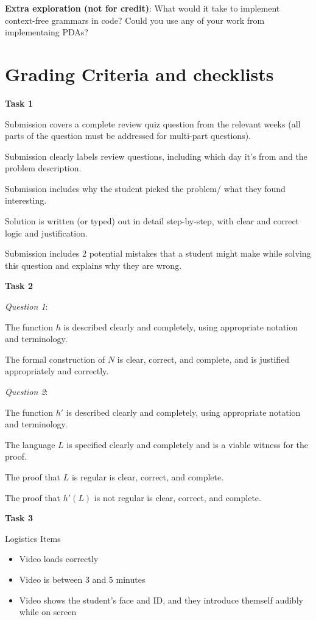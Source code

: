 {\bf Extra exploration (not for credit)}: What would it take to implement context-free grammars in code? 
Could you use any of your work from implementaing PDAs?

	
\section{Grading Criteria and checklists}

{\bf Task 1}

Submission covers a complete review quiz question from the relevant weeks 
(all parts of the question must be addressed for multi-part questions).

Submission clearly labels review questions, including which day it's from and the problem description.

Submission includes why the student picked the problem/ what they found interesting.

Solution is written (or typed) out in detail step-by-step, with clear and correct logic and justification.

Submission includes 2 potential mistakes that a student might make while solving this question 
and explains why they are wrong.


{\bf Task 2}

{\it Question 1}: 

The function $h$ is described clearly and completely, using appropriate notation and terminology.

The formal construction of $N$ is clear, correct, and complete, and is justified appropriately
and correctly.

{\it Question 2}:

The function $h'$ is described clearly and completely, using appropriate notation and terminology.
    
The language $L$ is specified clearly and completely and is a viable witness 
for the proof.

The proof that $L$ is regular is clear, correct, and complete.

The proof that $h'(L)$ is not regular is clear, correct, and complete.

{\bf Task 3}

Logistics Items
\begin{itemize}
    \item Video loads correctly
    \item Video is between 3 and 5 minutes
    \item Video shows the student's face and ID, and they 
	introduce themself audibly while on screen
\end{itemize}

